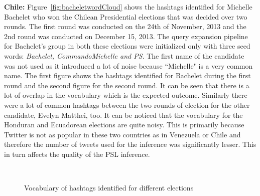 {\bf Chile:}
Figure~\ref{fig:bacheletwordCloud} shows the hashtags identified for Michelle Bachelet who won the Chilean Presidential elections that was decided over two rounds.
The first round was conducted on the 24th of November, 2013 and the 2nd round was conducted on December 15, 2013. 
The query expansion pipeline for Bachelet's group in both these elections were initialized only with three seed words: {\it Bachelet, CommandoMichelle and PS}. 
The first name of the candidate was not used as it introduced a lot of noise because ``Michelle" is a very common name.
The first figure shows the hashtags identified for Bachelet during the first round and the second figure for the second round. 
It can be seen that there is a lot of overlap in the vocabulary which is the expected outcome. 
Similarly there were a lot of common hashtags between the two rounds of election for the other candidate, Evelyn Matthei, too.
It can be noticed that the vocabulary for the Honduran and Ecuadorean  elections are quite noisy. 
This is primarily because Twitter is not as popular in these two countries as in Venezuela or Chile and therefore the number of tweets
used for the inference was significantly lesser.
This in turn affects the quality of the PSL inference.


\begin{figure}[t]
	\centering
	 \\
	\noindent 
	\caption{Vocabulary of hashtags identified for different elections} 
	\label{fig:countrywordCloud}
\end{figure}
\noindent



